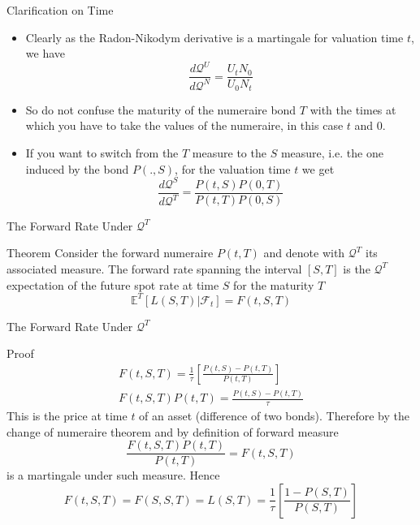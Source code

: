 \documentclass{beamer}
\begin{document}
\begin{frame}{Clarification on Time}
	\begin{itemize}
		\item Clearly as the Radon-Nikodym derivative is a martingale for valuation time $t$, we have
		\begin{equation}
			\frac{d\mathcal{Q}^U}{d\mathcal{Q}^N}=\frac{U_tN_0}{U_0N_t}
		\end{equation}
		\item So do not confuse the maturity of the numeraire bond $T$ with the times at which you have to take the values of the numeraire, in this case $t$ and 0.
		\item If you want to switch from the $T$ measure to the $S$ measure, i.e. the one induced by the bond $P(.,S)$, for the valuation time $t$ we get
		\begin{equation}
			\frac{d\mathcal{Q}^S}{d\mathcal{Q}^T}=\frac{P(t,S)P(0,T)}{P(t,T)P(0,S)}
		\end{equation}
	\end{itemize}
\end{frame}

\begin{frame}{The Forward Rate Under $\mathcal{Q}^T$}
	\begin{block}{Theorem}
		Consider the forward numeraire $P(t,T)$ and denote with $\mathcal{Q}^T$ its associated measure.
		The forward rate spanning the interval $[S,T]$ is the $\mathcal{Q}^T$ expectation of the future spot rate at time $S$ for the maturity $T$
		\begin{equation}
			\mathbb{E}^T[L(S,T)|\mathcal{F}_t] = F(t,S,T)
		\end{equation}
	\end{block}
\end{frame}

\begin{frame}{The Forward Rate Under $\mathcal{Q}^T$}
	\begin{block}{Proof}
		\begin{equation*}
			\begin{gathered}
				F(t,S,T) = \frac{1}{\tau}\left[\frac{P(t,S)-P(t,T)}{P(t,T)}\right] \\[0.3cm]
				F(t,S,T)P(t,T) = \frac{P(t,S)-P(t,T)}{\tau}
			\end{gathered}
		\end{equation*}
		This is the price at time $t$ of an asset (difference of two bonds). Therefore by the change of numeraire theorem and by definition of forward measure
		\begin{equation*}
			\frac{F(t,S,T)P(t,T)}{P(t,T)} = F(t,S,T)
		\end{equation*}
		is a martingale under such measure. Hence
		\begin{equation*}
			F(t,S,T) = F(S,S,T) = L(S,T) = \frac{1}{\tau}\left[\frac{1-P(S,T)}{P(S,T)}\right]
		\end{equation*}
	\end{block}
\end{frame}
\end{document}
